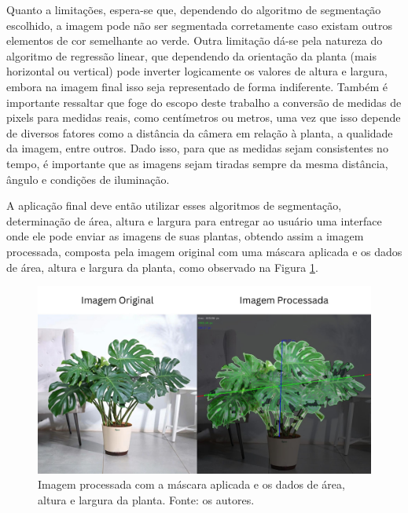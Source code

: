 Quanto a limitações, espera-se que, dependendo do algoritmo de segmentação escolhido, a imagem pode não ser segmentada corretamente caso existam outros elementos de cor semelhante ao verde. Outra limitação dá-se pela natureza do algoritmo de regressão linear, que dependendo da orientação da planta (mais horizontal ou vertical) pode inverter logicamente os valores de altura e largura, embora na imagem final isso seja representado de forma indiferente. Também é importante ressaltar que foge do escopo deste trabalho a conversão de medidas de pixels para medidas reais, como centímetros ou metros, uma vez que isso depende de diversos fatores como a distância da câmera em relação à planta, a qualidade da imagem, entre outros. Dado isso, para que as medidas sejam consistentes no tempo, é importante que as imagens sejam tiradas sempre da mesma distância, ângulo e condições de iluminação.

A aplicação final deve então utilizar esses algoritmos de segmentação, determinação de área, altura e largura para entregar ao usuário uma interface onde ele pode enviar as imagens de suas plantas, obtendo assim a imagem processada, composta pela imagem original com uma máscara aplicada e os dados de área, altura e largura da planta, como observado na Figura \ref{fig:exemplo-imagem-processada}.

\begin{figure}
    \centering
    \includegraphics[width=1\textwidth]{../figures/pi/exemplo-imagem-processada.jpg}
    \caption{Imagem processada com a máscara aplicada e os dados de área, altura e largura da planta. Fonte: os autores.}
    \label{fig:exemplo-imagem-processada}
\end{figure}
